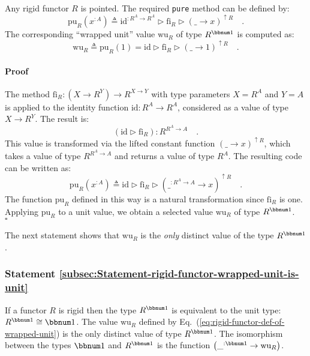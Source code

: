 Any rigid functor $R$ is pointed. The required \lstinline!pure!
method can be defined by:
\[
\text{pu}_{R}(x^{:A})\triangleq\text{id}^{:R^{A}\rightarrow R^{A}}\triangleright\text{fi}_{R}\triangleright(\_\rightarrow x)^{\uparrow R}\quad.
\]
The corresponding \textsf{``}wrapped unit\textsf{''} value $\text{wu}_{R}$ of type
$R^{\bbnum 1}$ is computed as: 
\begin{equation}
\text{wu}_{R}\triangleq\text{pu}_{R}(1)=\text{id}\triangleright\text{fi}_{R}\triangleright(\_\rightarrow1)^{\uparrow R}\quad.\label{eq:rigid-functor-def-of-wrapped-unit}
\end{equation}


\paragraph{Proof}

The method $\text{fi}_{R}:(X\rightarrow R^{Y})\rightarrow R^{X\rightarrow Y}$
with type parameters $X=R^{A}$ and $Y=A$ is applied to the identity
function $\text{id}:R^{A}\rightarrow R^{A}$, considered as a value
of type $X\rightarrow R^{Y}$. The result is:
\[
(\text{id}\triangleright\text{fi}_{R}):R^{R^{A}\rightarrow A}\quad.
\]
This value is transformed via the lifted constant function $\left(\_\rightarrow x\right)^{\uparrow R}$,
which takes a value of type $R^{R^{A}\rightarrow A}$ and returns
a value of type $R^{A}$. The resulting code can be written as:
\[
\text{pu}_{R}(x^{:A})\triangleq\text{id}\triangleright\text{fi}_{R}\triangleright(\_^{:R^{A}\rightarrow A}\rightarrow x)^{\uparrow R}\quad.
\]
The function $\text{pu}_{R}$ defined in this way is a natural transformation
since $\text{fi}_{R}$ is one. Applying $\text{pu}_{R}$ to a unit
value, we obtain a selected value $\text{wu}_{R}$ of type $R^{\bbnum 1}$.
$\quad$$\square$

The next statement shows that $\text{wu}_{R}$ is the \emph{only}
distinct value of the type $R^{\bbnum 1}$. 

\subsubsection{Statement \label{subsec:Statement-rigid-functor-wrapped-unit-is-unit}\ref{subsec:Statement-rigid-functor-wrapped-unit-is-unit}}

If a functor $R$ is rigid then the type $R^{\bbnum 1}$ is equivalent
to the unit type: $R^{\bbnum 1}\cong\bbnum 1$. The value $\text{wu}_{R}$
defined by Eq.~(\ref{eq:rigid-functor-def-of-wrapped-unit}) is the
only distinct value of type $R^{\bbnum 1}$. The isomorphism between
the types $\bbnum 1$ and $R^{\bbnum 1}$ is the function $\left(\_^{:\bbnum 1}\rightarrow\text{wu}_{R}\right)$.

